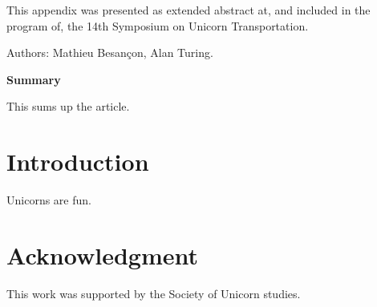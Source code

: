 
\label{chap:articleappendix}

This appendix was presented as extended abstract at, and included in the program of, the 14th Symposium on Unicorn Transportation.

Authors: Mathieu Besançon, Alan Turing.

\textbf{Summary}

This sums up the article.

\section{Introduction}

Unicorns are fun.

\section{Acknowledgment}

This work was supported by the Society of Unicorn studies.
